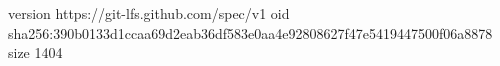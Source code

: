 version https://git-lfs.github.com/spec/v1
oid sha256:390b0133d1ccaa69d2eab36df583e0aa4e92808627f47e5419447500f06a8878
size 1404
